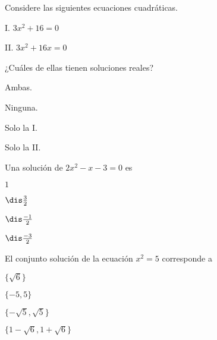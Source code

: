 \documentclass[12pt, fleqn]{article}
\begin{document}




\pagebreak

\item Considere las siguientes ecuaciones cuadráticas.
\vp

\begin{tcolorbox}
\bc
\benu
\item[I.] $3x^2+16=0$
\item[II.] $3x^2+16x=0$
\eenu
\ec
\end{tcolorbox}

¿Cuáles de ellas tienen soluciones reales?

\benu
\item[] \opc Ambas.
\item[] \opc Ninguna.
\item[] \opc Solo la I.
\item[] \opc Solo la II.
\eenu
\vs

\item Una solución de $2x^2-x-3=0$ es \vp

\benu
\item[] \opc $1$
\item[] \opc $\dis\frac32$
\item[] \opc $\dis\frac{-1}{2}$
\item[] \opc $\dis\frac{-3}{2}$
\eenu
\vs

\item El conjunto solución de la ecuación $x^2=5$ corresponde a
\vp

\benu
\item[] \opc $\{\sqrt6\}$
\item[] \opc $\{-5,5\}$
\item[] \opc $\{-\sqrt5,\sqrt5\}$
\item[] \opc $\{1-\sqrt6,1+\sqrt6\}$
\eenu
\vp
\end{document}

